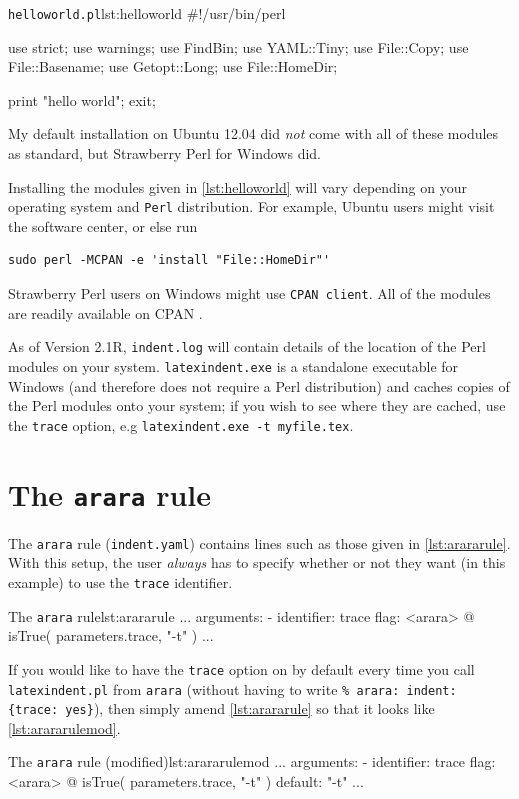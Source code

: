 \documentclass[11pt]{article}
\begin{document}
\begin{cmhlistings}[language=Perl]{\lstinline!helloworld.pl!}{lst:helloworld}
#!/usr/bin/perl

use strict;
use warnings;
use FindBin;
use YAML::Tiny;
use File::Copy;
use File::Basename;
use Getopt::Long;
use File::HomeDir;

print "hello world";
exit;
\end{cmhlistings}
My default installation on Ubuntu 12.04 did \emph{not} come
with all of these modules as standard, but Strawberry Perl for Windows \cite{strawberryperl}
did.

Installing the modules given in \cref{lst:helloworld} will vary depending on your
operating system and \lstinline!Perl! distribution. For example, Ubuntu users
might visit the software center, or else run
\begin{lstlisting}[numbers=none]
sudo perl -MCPAN -e 'install "File::HomeDir"'
\end{lstlisting}
Strawberry Perl users on Windows might use
\lstinline!CPAN client!. All of the modules are readily available on CPAN \cite{cpan}.

As of Version 2.1R,  \lstinline!indent.log! will contain details of the location
of the Perl modules on your system.  \lstinline!latexindent.exe! is a standalone
executable for Windows (and therefore does not require a Perl distribution) and caches copies of the Perl modules onto your system; if you 
wish to see where they are cached, use the  \lstinline!trace! option, e.g  \lstinline!latexindent.exe -t myfile.tex!.

\section{The \lstinline!arara! rule}
The \lstinline!arara! rule (\lstinline!indent.yaml!) contains lines such as those
given in \cref{lst:arararule}. With this setup, the user \emph{always} has
to specify whether or not they want (in this example) to use the \lstinline!trace!
identifier.
\begin{cmhlistings}[style=yaml,numbers=none]{The \lstinline!arara! rule}{lst:arararule}
...
arguments:
- identifier: trace
  flag: <arara> @{ isTrue( parameters.trace, "-t" ) }
...
\end{cmhlistings}

If you would like to have the \lstinline!trace! option on by default every time you
call \lstinline!latexindent.pl! from \lstinline!arara! (without having to write \lstinline!% arara: indent: {trace: yes}!), then simply
amend \cref{lst:arararule} so that it looks like \cref{lst:arararulemod}.
\begin{cmhlistings}[style=yaml,numbers=none]{The \lstinline!arara! rule (modified)}{lst:arararulemod}
...
arguments:
- identifier: trace
  flag: <arara> @{ isTrue( parameters.trace, "-t" ) }
  default: "-t"
...
\end{cmhlistings}
\end{document}
